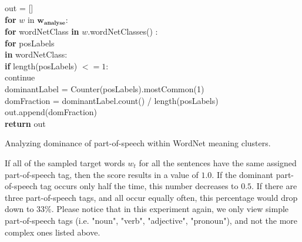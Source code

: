 \documentclass[a4paper,12pt,oneside,openright]{report}
\begin{document}
\hfill \break

\begin{algorithm}[H]
\SetAlgoLined
{}

out = [] \\

\textbf{for}  $w$ in $\mathbf{w_{\text{analyse}}}$:  \\
\quad \quad \textbf{for} wordNetClass \textbf{in} $w$.wordNetClasses() :  \\
\quad \quad \quad \textbf{for} posLabels \\
\quad \quad \quad \textbf{in} wordNetClass:  \\

\quad \quad \quad \quad \textbf{if} length(posLabels) $<= 1$: \\
\quad \quad \quad \quad \quad \quad  continue \\

\quad \quad \quad \quad dominantLabel = Counter(posLabels).mostCommon(1) \\

\quad \quad \quad \quad domFraction = dominantLabel.count() / length(posLabels) \\

\quad \quad \quad \quad out.append(domFraction) \\


\textbf{return} out
 
 \caption{Analyzing dominance of part-of-speech within WordNet meaning clusters.}
\end{algorithm}

\hfill \break

If all of the sampled target words $w_t$ for all the sentences have the same assigned part-of-speech tag, then the score results in a value of $1.0$.
If the dominant part-of-speech tag occurs only half the time, this number decreases to $0.5$.
If there are three part-of-speech tags, and all occur equally often, this percentage would drop down to $33\%$.
Please notice that in this experiment again, we only view simple part-of-speech tags (i.e. "noun", "verb", "adjective", "pronoun"), and not the more complex ones listed above.
\end{document}
